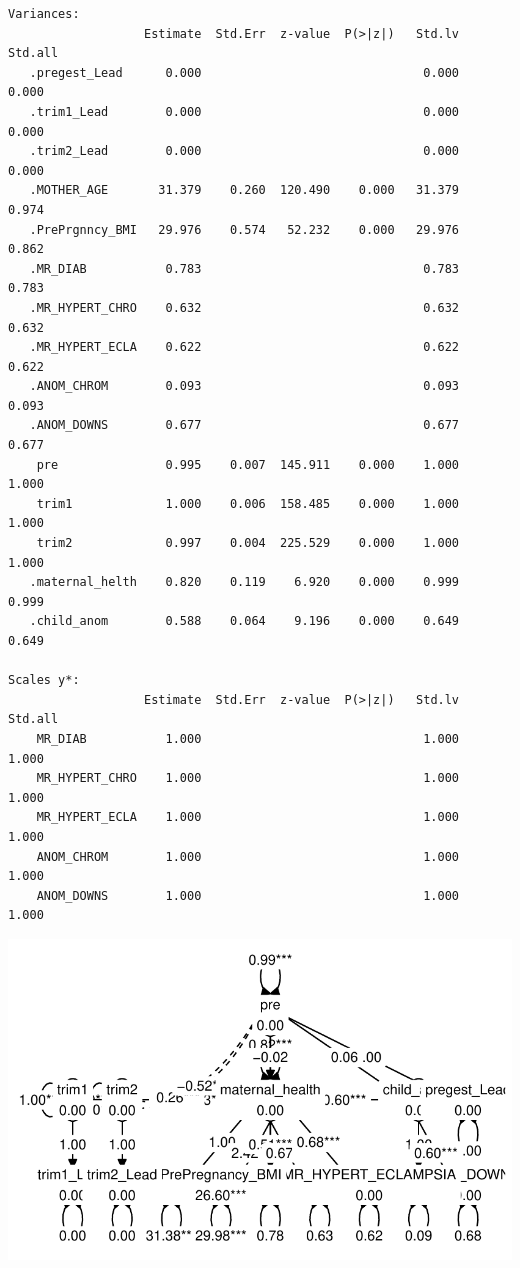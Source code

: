 \documentclass[
  letterpaper,
  DIV=11,
  numbers=noendperiod]{scrartcl}
\begin{document}
\begin{verbatim}
Variances:
                   Estimate  Std.Err  z-value  P(>|z|)   Std.lv  Std.all
   .pregest_Lead      0.000                               0.000    0.000
   .trim1_Lead        0.000                               0.000    0.000
   .trim2_Lead        0.000                               0.000    0.000
   .MOTHER_AGE       31.379    0.260  120.490    0.000   31.379    0.974
   .PrePrgnncy_BMI   29.976    0.574   52.232    0.000   29.976    0.862
   .MR_DIAB           0.783                               0.783    0.783
   .MR_HYPERT_CHRO    0.632                               0.632    0.632
   .MR_HYPERT_ECLA    0.622                               0.622    0.622
   .ANOM_CHROM        0.093                               0.093    0.093
   .ANOM_DOWNS        0.677                               0.677    0.677
    pre               0.995    0.007  145.911    0.000    1.000    1.000
    trim1             1.000    0.006  158.485    0.000    1.000    1.000
    trim2             0.997    0.004  225.529    0.000    1.000    1.000
   .maternal_helth    0.820    0.119    6.920    0.000    0.999    0.999
   .child_anom        0.588    0.064    9.196    0.000    0.649    0.649

Scales y*:
                   Estimate  Std.Err  z-value  P(>|z|)   Std.lv  Std.all
    MR_DIAB           1.000                               1.000    1.000
    MR_HYPERT_CHRO    1.000                               1.000    1.000
    MR_HYPERT_ECLA    1.000                               1.000    1.000
    ANOM_CHROM        1.000                               1.000    1.000
    ANOM_DOWNS        1.000                               1.000    1.000
\end{verbatim}

\includegraphics{analysis_files/figure-pdf/unnamed-chunk-5-1.pdf}
\end{document}
